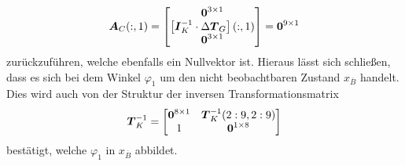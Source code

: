 \begin{equation}
\boldsymbol{A}_C(:,1) = \begin{bmatrix}
\boldsymbol{0}^{3\times 1} \\ \left[\boldsymbol{I}^{-1}_K\cdot \Delta\boldsymbol{T}_G\right](:,1)\\ \boldsymbol{0}^{3\times 1}
\end{bmatrix} = \boldsymbol{0}^{9\times 1}
\end{equation}
zurückzuführen, welche ebenfalls ein Nullvektor ist. Hieraus lässt sich schließen, dass es sich bei dem Winkel $\varphi_1$ um den nicht beobachtbaren Zustand $x_{\overline{B}}$ handelt. Dies wird auch von der Struktur der inversen Transformationsmatrix
\begin{equation}
\boldsymbol{T}^{-1}_K = \begin{bmatrix}
\boldsymbol{0}^{8\times 1} & \boldsymbol{T}^{-1}_K(2:9,2:9) \\
1 & \boldsymbol{0}^{1\times 8}
\end{bmatrix}
\end{equation}
bestätigt, welche $\varphi_1$ in $x_{\overline{B}}$ abbildet.

